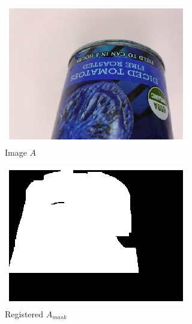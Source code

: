 \documentclass{article}
\begin{document}
\begin{figure}[h!]
  \centering
  \begin{subfigure}[b]{0.25\linewidth}
    \includegraphics[width=\linewidth]{data/images/04_Learned_Collage/base_original.png}
     \caption{Image $A$}
  \end{subfigure}
  \begin{subfigure}[b]{0.25\linewidth}
    \includegraphics[width=\linewidth]{data/images/04_Learned_Collage/original_mask.png}
    \caption{Registered $A_{mask}$}
  \end{subfigure}
  \begin{subfigure}[b]{0.25\linewidth}

\end{subfigure}
\end{figure}
\end{document}
